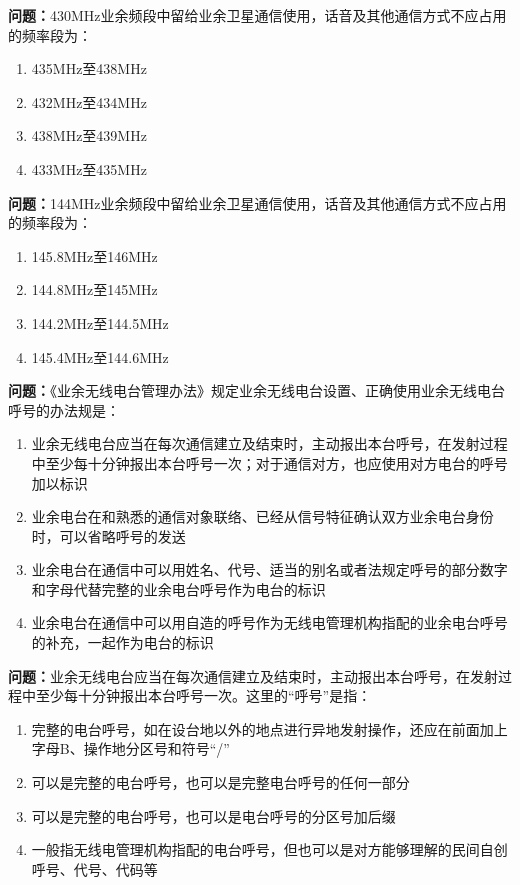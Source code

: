 \documentclass{ctexbook}
\begin{document}
\textbf{问题：}430MHz业余频段中留给业余卫星通信使用，话音及其他通信方式不应占用的频率段为：
\begin{enumerate}[label=\Alph*), leftmargin=3em]
\item 435MHz至438MHz
\item 432MHz至434MHz
\item 438MHz至439MHz
\item 433MHz至435MHz
\end{enumerate}

\textbf{问题：}144MHz业余频段中留给业余卫星通信使用，话音及其他通信方式不应占用的频率段为：
\begin{enumerate}[label=\Alph*), leftmargin=3em]
\item 145.8MHz至146MHz
\item 144.8MHz至145MHz
\item 144.2MHz至144.5MHz
\item 145.4MHz至144.6MHz
\end{enumerate}

\textbf{问题：}《业余无线电台管理办法》规定业余无线电台设置、正确使用业余无线电台呼号的办法规是：
\begin{enumerate}[label=\Alph*), leftmargin=3em]
\item 业余无线电台应当在每次通信建立及结束时，主动报出本台呼号，在发射过程中至少每十分钟报出本台呼号一次；对于通信对方，也应使用对方电台的呼号加以标识
\item 业余电台在和熟悉的通信对象联络、已经从信号特征确认双方业余电台身份时，可以省略呼号的发送
\item 业余电台在通信中可以用姓名、代号、适当的别名或者法规定呼号的部分数字和字母代替完整的业余电台呼号作为电台的标识
\item 业余电台在通信中可以用自造的呼号作为无线电管理机构指配的业余电台呼号的补充，一起作为电台的标识
\end{enumerate}

\textbf{问题：}业余无线电台应当在每次通信建立及结束时，主动报出本台呼号，在发射过程中至少每十分钟报出本台呼号一次。这里的“呼号”是指：
\begin{enumerate}[label=\Alph*), leftmargin=3em]
\item 完整的电台呼号，如在设台地以外的地点进行异地发射操作，还应在前面加上字母B、操作地分区号和符号“/”
\item 可以是完整的电台呼号，也可以是完整电台呼号的任何一部分
\item 可以是完整的电台呼号，也可以是电台呼号的分区号加后缀
\item 一般指无线电管理机构指配的电台呼号，但也可以是对方能够理解的民间自创呼号、代号、代码等
\end{enumerate}
\end{document}
